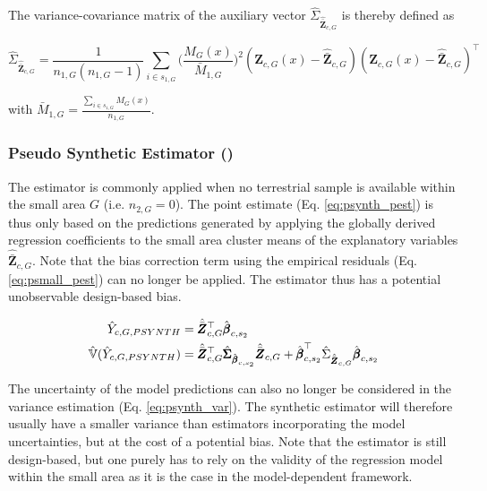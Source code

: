 The variance-covariance matrix of the auxiliary vector $\hat{\Sigma}_{\hat{\bar{\pmb{Z}}}_{c,G}}$ is thereby defined as
	
\begin{equation}\label{estvarcovaux_G}
\hat{\Sigma}_{\hat{\bar{\pmb{Z}}}_{c,G}} = \frac{1}{n_{1,G}(n_{1,G}-1)} \sum_{i \in s_{1,G}} \big(\frac{M_{G}(x)}{\bar{M}_{1,G}}\big)^2 (\pmb{Z}_{c,G}(x)-\hat{\bar{\pmb{Z}}}_{c,G})(\pmb{Z}_{c,G}(x)-\hat{\bar{\pmb{Z}}}_{c,G})^{\top}
\end{equation}

with $\bar{M}_{1,G}=\frac{\sum_{i \in s_{1,G}}M_{G}(x)}{n_{1,G}}$.\\



\subsubsection{Pseudo Synthetic Estimator (\psynth{})}

The \psynth{} estimator is commonly applied when no terrestrial sample is available within the small area $G$ (i.e. $n_{2,G}=0$). The point estimate (Eq. \ref{eq:psynth_pest}) is thus only based on the predictions generated by applying the globally derived regression coefficients to the small area cluster means of the explanatory variables $\hat{\bar{\pmb{Z}}}_{c,G}$. Note that the bias correction term using the empirical residuals (Eq. \ref{eq:psmall_pest}) can no longer be applied. The \psynth{} estimator thus has a potential unobservable design-based bias.

\begin{subequations}\label{eq:psynth}
	\begin{align}
	\hat{Y}_{c,G,PSYNTH} & =\hat{\bar{\pmb{Z}}}_{c,G}^{\top}\hat{\pmb{\beta}}_{c,s_2} \label{eq:psynth_pest} \\
	\hat{\mathbb{V}}(\hat{Y}_{c,G,PSYNTH})& =
	\hat{\bar{\pmb{Z}}}_{c,G}^{\top}\hat{\pmb{\Sigma}}_{\hat{\pmb{\beta}}_{c,s_2}}
	\hat{\bar{\pmb{Z}}}_{c,G}
	+ \hat{\pmb{\beta}}^{\top}_{c,s_2}\hat{\Sigma}_{\hat{\bar{\pmb{Z}}}_{c,G}}\hat{\pmb{\beta}}_{c,s_2} \label{eq:psynth_var}
	\end{align}
\end{subequations}

The uncertainty of the model predictions can also no longer be considered in the variance estimation (Eq. \ref{eq:psynth_var}). The synthetic estimator will therefore usually have a smaller variance than estimators incorporating the model uncertainties, but at the cost of a potential bias. Note that the \psynth{} estimator is still design-based, but one purely has to rely on the validity of the regression model within the small area as it is the case in the model-dependent framework.\\

